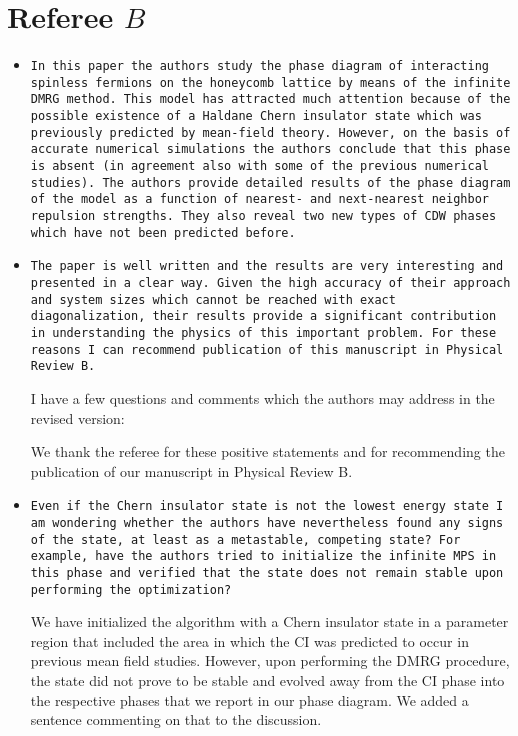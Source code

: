 \documentclass[aps,prb,superscriptaddress]{revtex4}
\begin{document}
\section*{Referee $B$}

\begin{itemize}

\item{\tt In this paper the authors study the phase diagram of interacting
spinless fermions on the honeycomb lattice by means of the infinite
DMRG method. This model has attracted much attention because of the
possible existence of a Haldane Chern insulator state which was
previously predicted by mean-field theory. However, on the basis of
accurate numerical simulations the authors conclude that this phase is
absent (in agreement also with some of the previous numerical
studies). The authors provide detailed results of the phase diagram of
the model as a function of nearest- and next-nearest neighbor
repulsion strengths. They also reveal two new types of CDW phases
which have not been predicted before.}

\item{\tt The paper is well written and the results are very interesting and
presented in a clear way. Given the high accuracy of their approach
and system sizes which cannot be reached with exact diagonalization,
their results provide a significant contribution in understanding the
physics of this important problem. For these reasons I can recommend
publication of this manuscript in Physical Review B.

I have a few questions and comments which the authors may address in
the revised version:}

We thank the referee for these positive statements and for recommending the publication of our manuscript in Physical Review B. 


\item{\tt Even if the Chern insulator state is not the lowest energy state I
am wondering whether the authors have nevertheless found any signs of
the state, at least as a metastable, competing state? For example,
have the authors tried to initialize the infinite MPS in this phase
and verified that the state does not remain stable upon performing the
optimization?}

We have initialized the algorithm with a Chern insulator state in a parameter region that included the area in which the CI was predicted to occur in previous mean field studies. However, upon performing the DMRG procedure, the state did not prove to be stable and evolved away from the CI phase into the respective phases that we report in our phase diagram. We added a sentence commenting on that to the discussion.
 

\end{itemize}
\end{document}
